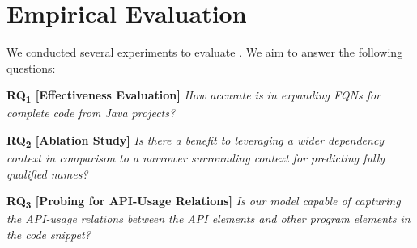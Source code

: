 \section{Empirical Evaluation}
\label{sec:evaluation}


We conducted several experiments to evaluate {\tool}. We aim to answer the following questions:

\vspace{2pt}
\noindent \textbf{RQ\textsubscript{1} 
  [Effectiveness Evaluation]} {\em How accurate is {\tool} in expanding FQNs for complete code from Java projects?}

\vspace{2pt}
\noindent \textbf{RQ\textsubscript{2} 
[Ablation Study]}  {\em Is there a benefit to leveraging a wider dependency context in comparison to a narrower surrounding context for predicting fully qualified names?}

\vspace{2pt}
\noindent \textbf{RQ\textsubscript{3} [Probing for API-Usage Relations]} {\em Is our model capable of capturing the API-usage relations between the API elements and other program elements in the code snippet?}


%
